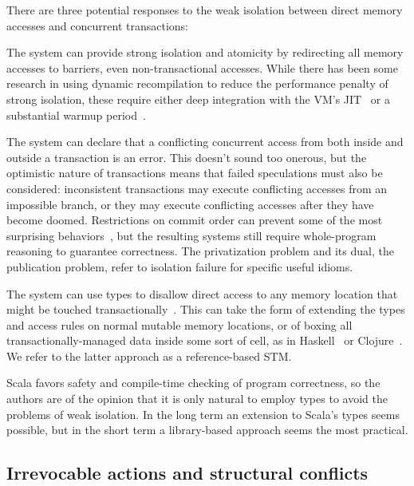 There are three potential responses to the weak isolation between direct memory
accesses and concurrent transactions:
\begin{packed_itemize}

\item The system can provide strong isolation and atomicity by redirecting
all memory accesses to barriers, even non-transactional accesses.
While there has been some research in using dynamic recompilation
to reduce the performance penalty of strong isolation, these require
either deep integration with the VM's JIT~\cite{schneider08dynamic}
or a substantial warmup period~\cite{bronson09dbo}.

\item The system can declare that a conflicting concurrent access
from both inside and outside a transaction is an error.  This doesn't
sound too onerous, but the optimistic nature of transactions means that
failed speculations must also be considered: inconsistent transactions
may execute conflicting accesses from an impossible branch, or they
may execute conflicting accesses after they have become doomed.
Restrictions on commit order can prevent some of the most surprising
behaviors~\cite{sgla08}, but the resulting systems still require
whole-program reasoning to guarantee correctness.  The privatization
problem and its dual, the publication problem, refer to isolation failure
for specific useful idioms.

\item The system can use types to disallow direct access to any memory
location that might be touched transactionally~\cite{moore08semantics}.
This can take the form of extending the types and access rules on
normal mutable memory locations, or
of boxing all transactionally-managed data inside some sort of cell,
as in Haskell~\cite{harris05composable} or Clojure~\cite{hickey08clojure}.  We refer to the latter
approach as a reference-based STM.

\end{packed_itemize}

Scala favors safety and compile-time checking of program correctness,
so the authors are of the opinion that it is only natural to employ types
to avoid the problems of weak isolation.  In the long term an extension
to Scala's types seems possible, but in the short term a library-based
approach seems the most practical.

\subsection{Irrevocable actions and structural conflicts}

